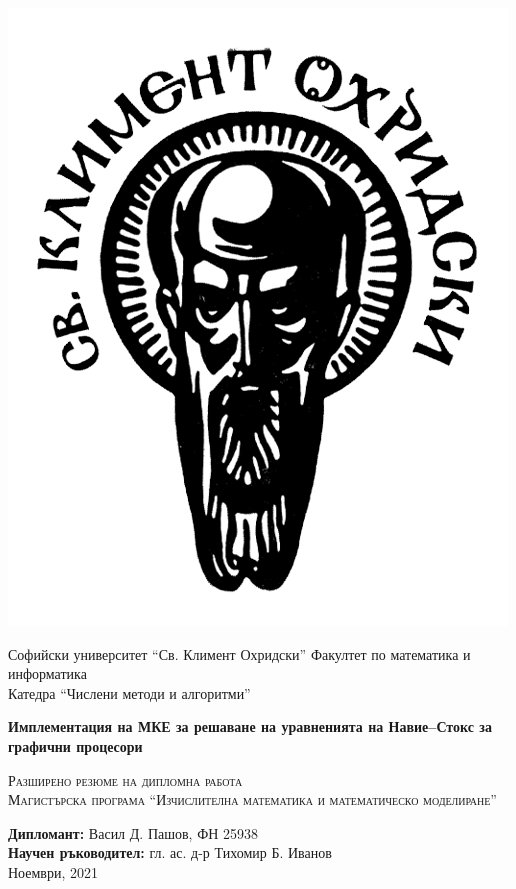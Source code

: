 \documentclass[12pt]{report}
\begin{document}
\begin{titlepage}
\begin{center}
\begin{minipage}{0.45\textwidth}
	\includegraphics[scale=0.2]{Figures/2_SU_bg_n.png}
\end{minipage}
\begin{minipage}{0.45\textwidth}
	\footnotesize
	Софийски университет ``Св. Климент Охридски'' Факултет по математика и информатика\\
	\vfill
	Катедра ``Числени методи и алгоритми''
\end{minipage}

\vspace{1.5cm}

\textbf{\Large Имплементация на МКЕ за решаване на уравненията на Навие--Стокс за графични процесори}

\vspace{1.5cm}
\small
\textsc{Разширено резюме на дипломна работа}\\
\textsc{Магистърска програма ``Изчислителна математика и математическо моделиране''}
\vfill

\textbf{Дипломант:} Васил Д. Пашов, ФН 25938\\
\textbf{Научен ръководител:} гл. ас. д-р Тихомир Б. Иванов\\
\vfill
Ноември, 2021


\end{center}
\end{titlepage}
\end{document}
